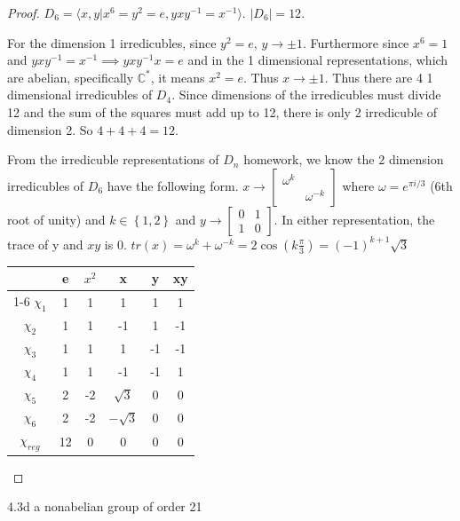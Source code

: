 \documentclass{article}
\newcommand{\C}{\mathbb{C}}
\newcommand{\angles}[1]{\langle #1 \rangle}
\begin{document}
\begin{proof}
    $D_6 = \angles{x, y | x^6 = y^2 = e, yxy^{-1}=x^{-1}}$. $|D_6| = 12$. 

    For the dimension 1 irredicubles, since $y^2 = e$, $y \to \pm 1$. Furthermore since $x^6 = 1$ and $yxy^{-1} = x^{-1} \implies yxy^{-1}x = e$ and in the 1 dimensional representations, which are abelian, specifically $\C^*$,  it means $x^2 = e$. Thus $x \to \pm 1$. Thus there are 4 1 dimensional irredicubles of $D_4$. Since dimensions of the irredicubles must divide 12 and the sum of the squares must add up to 12, there is only 2 irredicuble of dimension 2. So $4 + 4 + 4 = 12$. 
    
    From the irredicuble representations of $D_n$ homework, we know the 2 dimension irredicubles of $D_6$ have the following form. $x \to \begin{bmatrix}
        \omega^k \\ & \omega^{-k}
    \end{bmatrix}$ where $\omega = e^{\pi i / 3}$ (6th root of unity) and $k \in \left\{1, 2 \right\}$ and $y \to \begin{bmatrix}
        0 & 1 \\ 1 & 0
    \end{bmatrix}$. In either representation, the trace of y and $xy$  is 0. $tr(x) = \omega^{k} + \omega^{-k} = 2\cos(k\frac{\pi}{3}) = (-1)^{k + 1} \sqrt{3}$  
    
    
    \begin{tabular}{c | c c c c c }
        & e & $x^2$ & x & y & xy  \\
        \cline{1-6}
        $\chi_1$ & 1 & 1 & 1 & 1 & 1 \\
        $\chi_2$ & 1 & 1 & -1 & 1 & -1 \\
        $\chi_3$ & 1 & 1 & 1 & -1 & -1 \\
        $\chi_4$ & 1 & 1 & -1 & -1 & 1 \\
        $\chi_5$ & 2 & -2 & $\sqrt{3}$ & 0 & 0 \\
        $\chi_6$ & 2 & -2 & $-\sqrt{3}$ & 0 & 0 \\
        $\chi_{reg}$ & 12 & 0 & 0 & 0 & 0 

    \end{tabular} 
\end{proof}
\begin{PROB}{4.3d}\label{Problem 4.3d.}
    a nonabelian group of order 21
\end{PROB}
\end{document}
